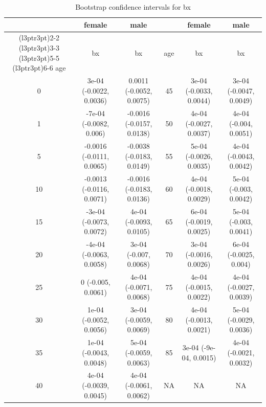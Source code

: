 \documentclass[
  12pt,
]{report}
\begin{document}
\begin{table}[!h]
\centering
\caption{\label{tab:unnamed-chunk-15}Bootstrap confidence intervals for bx}
\centering
\begin{tabular}[t]{ccc|>{}ccc}
\toprule
\multicolumn{1}{c}{ } & \multicolumn{1}{c}{female} & \multicolumn{1}{c}{male} & \multicolumn{1}{c}{ } & \multicolumn{1}{c}{female} & \multicolumn{1}{c}{male} \\
\cmidrule(l{3pt}r{3pt}){2-2} \cmidrule(l{3pt}r{3pt}){3-3} \cmidrule(l{3pt}r{3pt}){5-5} \cmidrule(l{3pt}r{3pt}){6-6}
age & bx & bx & age & bx & bx\\
\midrule
0 & 3e-04 (-0.0022, 0.0036) & 0.0011 (-0.0052, 0.0075) & 45 & 3e-04 (-0.0033, 0.0044) & 3e-04 (-0.0047, 0.0049)\\
1 & -7e-04 (-0.0082, 0.006) & -0.0016 (-0.0157, 0.0138) & 50 & 4e-04 (-0.0027, 0.0037) & 4e-04 (-0.004, 0.0051)\\
5 & -0.0016 (-0.0111, 0.0065) & -0.0038 (-0.0183, 0.0149) & 55 & 5e-04 (-0.0026, 0.0035) & 4e-04 (-0.0043, 0.0042)\\
10 & -0.0013 (-0.0116, 0.0071) & -0.0016 (-0.0183, 0.0136) & 60 & 4e-04 (-0.0018, 0.0029) & 5e-04 (-0.003, 0.0042)\\
15 & -3e-04 (-0.0073, 0.0072) & 4e-04 (-0.0093, 0.0105) & 65 & 6e-04 (-0.0019, 0.0025) & 5e-04 (-0.003, 0.0041)\\
20 & -4e-04 (-0.0063, 0.0058) & 3e-04 (-0.007, 0.0068) & 70 & 3e-04 (-0.0016, 0.0026) & 6e-04 (-0.0025, 0.004)\\
25 & 0 (-0.005, 0.0061) & 4e-04 (-0.0071, 0.0068) & 75 & 4e-04 (-0.0015, 0.0022) & 4e-04 (-0.0027, 0.0039)\\
30 & 1e-04 (-0.0052, 0.0056) & 3e-04 (-0.0059, 0.0069) & 80 & 4e-04 (-0.0013, 0.0021) & 5e-04 (-0.0029, 0.0036)\\
35 & 1e-04 (-0.0043, 0.0048) & 5e-04 (-0.0059, 0.0063) & 85 & 3e-04 (-9e-04, 0.0015) & 4e-04 (-0.0021, 0.0032)\\
40 & 4e-04 (-0.0039, 0.0045) & 4e-04 (-0.0061, 0.0062) & NA & NA & NA\\
\bottomrule
\end{tabular}
\end{table}
\end{document}
